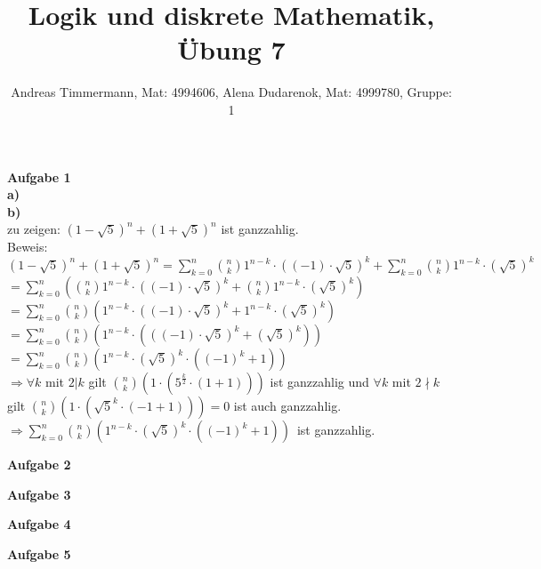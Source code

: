 \documentclass[a4paper]{scrartcl}
\title{Logik und diskrete Mathematik, Übung 7}
\author{Andreas Timmermann, Mat: 4994606, Alena Dudarenok, Mat: 4999780, Gruppe: 1}
\begin{document}
	\maketitle
	\begin{flushleft}
		\textbf{Aufgabe 1}\\
		\textbf{a)}\\
		
		\textbf{b)}\\
		zu zeigen: $(1-\sqrt{5})^n + (1+\sqrt{5})^n$ ist ganzzahlig.\\
		Beweis:\\
		$(1-\sqrt{5})^n + (1+\sqrt{5})^n = \sum\limits_{k=0}^{n}\binom{n}{k}1^{n-k}\cdot ((-1)\cdot \sqrt{5})^k + \sum\limits_{k=0}^{n}\binom{n}{k}1^{n-k}\cdot (\sqrt{5})^k$\\
		$= \sum\limits_{k=0}^{n}(\binom{n}{k}1^{n-k}\cdot ((-1)\cdot \sqrt{5})^k + \binom{n}{k}1^{n-k}\cdot (\sqrt{5})^k)$\\
		$= \sum\limits_{k=0}^{n}\binom{n}{k}(1^{n-k}\cdot ((-1)\cdot \sqrt{5})^k + 1^{n-k}\cdot (\sqrt{5})^k)$\\
		$= \sum\limits_{k=0}^{n}\binom{n}{k}(1^{n-k}\cdot (((-1)\cdot \sqrt{5})^k + (\sqrt{5})^k))$\\
		$= \sum\limits_{k=0}^{n}\binom{n}{k}(1^{n-k}\cdot (\sqrt{5})^k \cdot((-1)^k  + 1))$\\
		$\Rightarrow \forall k $ mit $2|k$ gilt $\binom{n}{k}(1\cdot (5^{\frac{k}{2}} \cdot(1  + 1)))$ ist ganzzahlig und $\forall k $ mit $2\nmid k$ gilt $\binom{n}{k}(1\cdot (\sqrt{5}^k \cdot(-1  + 1))) = 0$ ist auch ganzzahlig.\\
		$\Rightarrow \sum\limits_{k=0}^{n}\binom{n}{k}(1^{n-k}\cdot (\sqrt{5})^k \cdot((-1)^k  + 1))$\ ist ganzzahlig.\\
	\end{flushleft}
	\begin{flushleft}
		\textbf{Aufgabe 2}\\
	\end{flushleft}
	\begin{flushleft}
		\textbf{Aufgabe 3}\\
	\end{flushleft}
	\begin{flushleft}
		\textbf{Aufgabe 4}\\
	\end{flushleft}
	\begin{flushleft}
		\textbf{Aufgabe 5}\\
	\end{flushleft}
\end{document}
